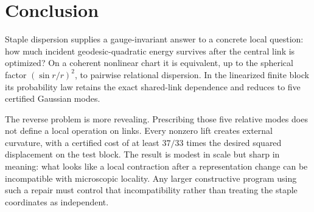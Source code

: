 \section{Conclusion}

Staple dispersion supplies a gauge-invariant answer to a concrete local
question: how much incident geodesic-quadratic energy survives after the
central link is optimized?  On a coherent nonlinear chart it is equivalent,
up to the spherical factor $(\sin r/r)^2$, to pairwise relational dispersion.
In the linearized finite block its probability law retains the exact
shared-link dependence and reduces to five certified Gaussian modes.

The reverse problem is more revealing.  Prescribing those five relative modes
does not define a local operation on links.  Every nonzero lift creates
external curvature, with a certified cost of at least $37/33$ times the
desired squared displacement on the test block.  The result is modest in
scale but sharp in meaning: what looks like a local contraction after a
representation change can be incompatible with microscopic locality.  Any
larger constructive program using such a repair must control that
incompatibility rather than treating the staple coordinates as independent.
